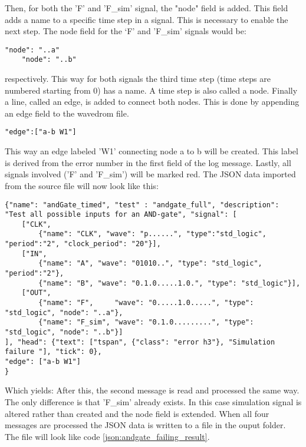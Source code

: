 \npar
Then, for both the 'F' and 'F\_sim' signal, the "node" field is added. This field adds a name to a specific time step in a signal. This is necessary to enable the next step. The node field for the ‘F’ and 'F\_sim' signals would be:
\begin{lstlisting}[style=json]
	"node": "..a"
	"node": "..b"
\end{lstlisting}\noindent
respectively. This way for both signals the third time step (time steps are numbered starting from 0) has a name. A time step is also called a node.
\npar
Finally a line, called an edge, is added to connect both nodes. This is done by appending an edge field to the wavedrom file.
\begin{lstlisting}[style=json]
"edge":["a-b W1"]
\end{lstlisting}\noindent
This way an edge labeled 'W1' connecting node a to b will be created. This label is derived from the error number in the first field of the log message.
\npar
Lastly, all signals involved ('F' and 'F\_sim') will be marked red.
\npar
The JSON data imported from the source file will now look like this:
\begin{lstlisting}[style=json, caption={Temporary content of the result file of a failing AND-gate example}, label={json:andgate_failing_part}]
{"name": "andGate_timed", "test" : "andgate_full", "description": "Test all possible inputs for an AND-gate", "signal": [
	["CLK",
		{"name": "CLK", "wave": "p......", "type":"std_logic", "period":"2", "clock_period": "20"}],
	["IN",
		{"name": "A", "wave": "01010..", "type": "std_logic", "period":"2"},
		{"name": "B", "wave": "0.1.0.....1.0.", "type": "std_logic"}],
	["OUT",
		{"name": "F",     "wave": "0.....1.0.....", "type": "std_logic", "node": "..a"},
		{"name": "F_sim", "wave": "0.1.0.........", "type": "std_logic", "node": "..b"}]
], "head": {"text": ["tspan", {"class": "error h3"}, "Simulation failure "], "tick": 0}, 
"edge": ["a-b W1"]
}
\end{lstlisting}\noindent
Which yields:
\nline
After this, the second message is read and processed the same way. The only difference is that 'F\_sim' already exists. In this case simulation signal is altered rather than created and the node field is extended.
\npar
When all four messages are processed the JSON data is written to a file in the  ouput folder. The file will look like code \ref{json:andgate_failing_result}.
